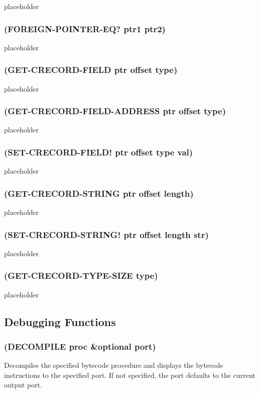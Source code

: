 \documentclass[11pt]{article}
\begin{document}
placeholder
\subsubsection{(FOREIGN-POINTER-EQ? ptr1 ptr2)}
\label{sec-4-43-8}

placeholder
\subsubsection{(GET-CRECORD-FIELD ptr offset type)}
\label{sec-4-43-9}

placeholder
\subsubsection{(GET-CRECORD-FIELD-ADDRESS ptr offset type)}
\label{sec-4-43-10}

placeholder
\subsubsection{(SET-CRECORD-FIELD! ptr offset type val)}
\label{sec-4-43-11}

placeholder
\subsubsection{(GET-CRECORD-STRING ptr offset length)}
\label{sec-4-43-12}

placeholder
\subsubsection{(SET-CRECORD-STRING! ptr offset length str)}
\label{sec-4-43-13}

placeholder
\subsubsection{(GET-CRECORD-TYPE-SIZE type)}
\label{sec-4-43-14}

placeholder
\subsection{Debugging Functions}
\label{sec-4-44}

\subsubsection{(DECOMPILE proc \&optional port)}
\label{sec-4-44-1}

Decompiles the specified bytecode procedure and displays the bytecode
instructions to the specified port.  If not specified, the port defaults
to the current output port.
\end{document}

